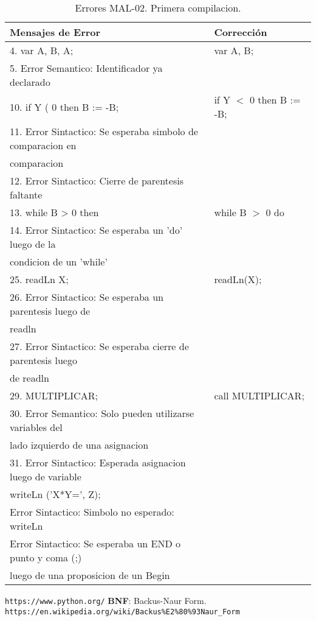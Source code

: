 \documentclass[a4paper,12pt]{article}
\begin{document}
\begin{table}[h!]
\centering
\begin{tabular}{|l|l|}
\hline
Mensajes de Error & Corrección\\
\hline
4. var A, B, A;												& var A, B;\\
5. Error Semantico: Identificador ya declarado				&\\
10. if Y ( 0 then B := -B;									& if Y $<$ 0 then B := -B;\\
11. Error Sintactico: Se esperaba simbolo de comparacion en 	&\\
comparacion													&\\
12. Error Sintactico: Cierre de parentesis faltante			&\\
\hline
13. while B > 0 then											& while B $>$ 0 do\\
14. Error Sintactico: Se esperaba un 'do' luego de la		&\\
condicion de un 'while'										&\\
\hline
25. readLn X;												& readLn(X);\\
26. Error Sintactico: Se esperaba un parentesis luego de		& \\
readln 														& \\
27. Error Sintactico: Se esperaba cierre de parentesis luego	& \\
de readln 													& \\
\hline
29. MULTIPLICAR;												& call MULTIPLICAR;\\
30. Error Semantico: Solo pueden utilizarse variables del 	&\\
lado izquierdo de una asignacion								&\\
31. Error Sintactico: Esperada asignacion luego de variable	&\\
writeLn ('X*Y=', Z);											&\\
Error Sintactico: Simbolo no esperado: writeLn				&\\
Error Sintactico: Se esperaba un END o punto y coma (;)		&\\
luego de una proposicion de un Begin							&\\
\hline	
\end{tabular}
\caption{Errores MAL-02. Primera compilacion.}
\label{MAL-02-1}
\end{table}

\begin{thebibliography}{10}
 \texttt{https://www.python.org/}
 \textbf{BNF}: Backus-Naur Form. \texttt{https://en.wikipedia.org/wiki/Backus\%E2\%80\%93Naur\_Form}
\end{thebibliography}
\end{document}
